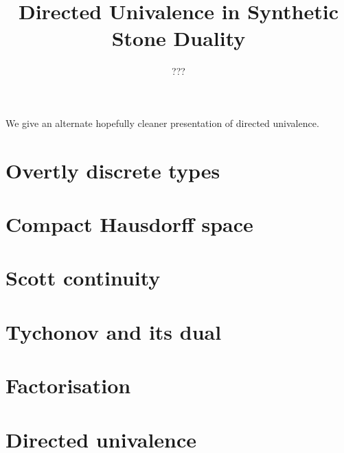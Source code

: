 \documentclass{../util/zariski}
\title{Directed Univalence in Synthetic Stone Duality}
\begin{document}
\author{???}

\maketitle

We give an alternate hopefully cleaner presentation of directed univalence.


\tableofcontents

\section{Overtly discrete types}


\section{Compact Hausdorff space}


\section{Scott continuity}


\section{Tychonov and its dual}


\section{Factorisation}


\section{Directed univalence}


\printbibliography
\end{document}
